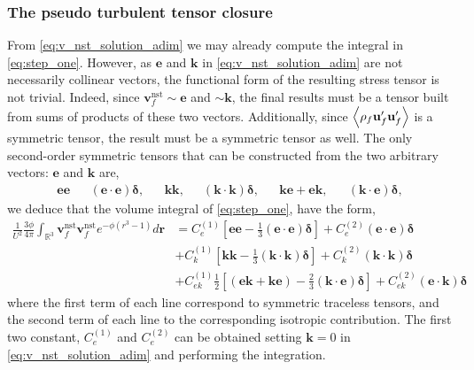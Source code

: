 \subsubsection{The pseudo turbulent tensor closure}

From \ref{eq:v_nst_solution_adim} we may already compute the integral in \ref{eq:step_one}. 
However, as $\textbf{e}$ and $\textbf{k}$ in \ref{eq:v_nst_solution_adim}  are not necessarily collinear vectors, the functional form of the resulting stress tensor is not trivial. 
Indeed, since $\textbf{v}_f^\text{nst}\sim \textbf{e}$ and $\sim \textbf{k}$, the final results must be a tensor built from sums of products of these two vectors.  
Additionally, since $\left<\rho_f \textbf{u}_f'\textbf{u}_f'\right>$ is a symmetric tensor, the result must be a symmetric tensor as well. 
The only second-order symmetric tensors that can be constructed from the  two arbitrary vectors: $\textbf{e}$ and $\textbf{k}$ are, 
\begin{align*}
    \textbf{ee}
    && (\textbf{e}\cdot \textbf{e})\bm\delta, 
    && \textbf{kk},
    && (\textbf{k}\cdot \textbf{k})\bm\delta,
    && \textbf{ke}+\textbf{ek},
    && (\textbf{k}\cdot \textbf{e})\bm\delta, 
\end{align*}
we deduce that the volume integral of \ref{eq:step_one}, have the form, 
\begin{align}
    \frac{1}{U^2}
    \frac{3\phi}{4\pi}\int_{\mathbb{R}^3}
    \textbf{v}_f^\text{nst}
    \textbf{v}_f^\text{nst}
     e^{-\phi(r^3 -1)}
    d\textbf{r}
    &= C^{(1)}_e \left[
        \textbf{ee}
         - \frac{1}{3}(\textbf{e}\cdot \textbf{e})\bm\delta
    \right]
    + C^{(2)}_e 
    (\textbf{e}\cdot \textbf{e})\bm\delta \nonumber \\
    &+ C^{(1)}_k \left[
        \textbf{kk}
         - \frac{1}{3}(\textbf{k}\cdot \textbf{k})\bm\delta
    \right]
    + C^{(2)}_k 
    (\textbf{k}\cdot \textbf{k})\bm\delta \nonumber \\
    &+ C^{(1)}_{ek} \frac{1}{2}\left[
        (\textbf{ek}  + \textbf{ke})
         - \frac{2}{3}(\textbf{k}\cdot \textbf{e})\bm\delta
    \right]
    + C^{(2)}_{ek} 
    (\textbf{e}\cdot \textbf{k})\bm\delta 
    \label{eq:functional_form}
\end{align}
where the first term of each line correspond to symmetric traceless tensors, and the second term of each line to the corresponding isotropic contribution. 
The first two constant, $C^{(1)}_e$ and $C^{(2)}_e$ can be obtained setting $\textbf{k}= 0$ in \ref{eq:v_nst_solution_adim} and performing the integration. 
